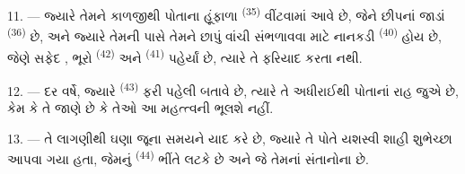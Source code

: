11. --- જ્યારે તેમને કાળજીથી પોતાના હૂંફાળા 
\textsuperscript{(35)} વીંટવામાં આવે છે, જેને છીપનાં જાડાં
 \textsuperscript{(36)} છે, અને જ્યારે તેમની પાસે તેમને
છાપું વાંચી સંભળાવવા માટે નાનકડી 
\textsuperscript{(40)} હોય છે, જેણે સફેદ , ભૂરો
 \textsuperscript{(42)} અને 
\textsuperscript{(41)} પહેર્યાં છે, ત્યારે તે ફરિયાદ કરતા નથી.

12. --- દર વર્ષે, જ્યારે  \textsuperscript{(43)} ફરી
પહેલી   બતાવે છે, ત્યારે તે અધીરાઈથી
પોતાનાં  રાહ જુએ છે, કેમ કે તે જાણે છે કે તેઓ આ
મહત્ત્વની  ભૂલશે નહીં.

13. --- તે લાગણીથી ઘણા જૂના સમયને યાદ કરે છે, જ્યારે તે પોતે
યશસ્વી શાહી  શુભેચ્છા આપવા ગયા હતા, જેમનું
 \textsuperscript{(44)} ભીંતે લટકે છે અને જે તેમનાં
સંતાનોના  છે.

\VUsaut{6.0mm}
\VUfilet{22mm}
